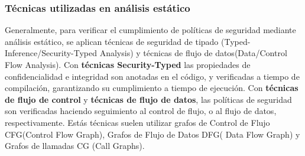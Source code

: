 \subsubsection{Técnicas utilizadas en análisis estático} 
Generalmente, para verificar el cumplimiento de políticas de seguridad mediante
análisis estático, se aplican técnicas de seguridad de tipado
(Typed-Inference/Security-Typed Analysis) y técnicas de flujo de
datos(Data/Control Flow Analysis)\cite{Information-Flow-Java}.\newline 
Con \textbf{técnicas Security-Typed} las propiedades de confidencialidad e
integridad son anotadas en el código, y verificadas a tiempo de compilación,
garantizando su cumplimiento a tiempo de ejecución.\newline 
Con \textbf{técnicas de flujo de control} y \textbf{técnicas de flujo de datos},
las políticas de seguridad son verificadas haciendo seguimiento al control de
flujo, o al flujo de datos, respectivamente. Estás técnicas suelen utilizar
grafos de Control de Flujo CFG(Control Flow Graph), Grafos de Flujo de Datos
DFG( Data Flow Graph) y Grafos de llamadas CG (Call Graphs).

